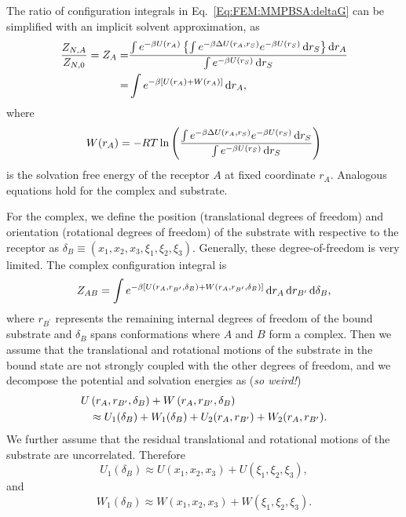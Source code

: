 The ratio of configuration integrals in Eq.~\ref{Eq:FEM:MMPBSA:deltaG} can be simplified with an implicit solvent approximation, as
\begin{align}
	\frac{Z_{N,A}}{Z_{N,0}}=Z_A=&\frac{\int e^{-\beta U(r_A)}\left\{\int e^{-\beta\Delta U(r_A,r_S)}e^{-\beta U(r_S)}\mathop{}\!\mathrm{d} r_S\right\}\mathop{}\!\mathrm{d} r_A}{\int e^{-\beta U(r_S)}\mathop{}\!\mathrm{d} r_S}\notag\\
	                           =&\int e^{-\beta \left[U(r_A)+W(r_A)\right]}\mathop{}\!\mathrm{d} r_A,
\end{align}
where
\begin{equation}
	W(r_A)=-RT\ln{\left(\frac{\int e^{-\beta\Delta U(r_A,r_S)}e^{-\beta U(r_S)}\mathop{}\!\mathrm{d}r_S}{\int e^{-\beta U(r_S)}\mathop{}\!\mathrm{d}r_S}\right)}
\end{equation}
is the solvation free energy of the receptor $A$ at fixed coordinate $r_A$. Analogous equations hold for the complex and substrate.

For the complex, we define the position (translational degrees of freedom) and orientation (rotational degrees of freedom) of the substrate with respective to the receptor as $\delta_B\equiv\left(x_1,x_2,x_3,\xi_1,\xi_2,\xi_3\right)$. Generally, these degree-of-freedom is very limited. The complex configuration integral is 
\begin{equation}
	Z_{AB}=\int e^{-\beta\left[U\left(r_A,r_{B^\prime},\delta_B\right)+W\left(r_A,r_{B^\prime},\delta_B\right)\right]}\mathop{}\!\mathrm{d} r_A\mathop{}\!\mathrm{d} r_{B^\prime}\mathop{}\!\mathrm{d}\delta_B,
\end{equation}
where $r_{B^\prime}$ represents the remaining internal degrees of freedom of the bound substrate and $\delta_B$ spans conformations where $A$ and $B$ form a complex. 
Then we assume that the translational and rotational motions of the substrate in the bound state are not strongly coupled with the other degrees of freedom, and we decompose the potential and solvation energies as (\textit{so weird!})
\begin{align}
	U&\left(r_A,r_{B^\prime},\delta_B\right)+W\left(r_A,r_{B^\prime},\delta_B\right)\notag\\
	 &\approx U_1(\delta_B) + W_1(\delta_B) +U_2(r_A,r_{B^\prime})+W_2(r_A,r_{B^\prime}).
\end{align}
We further assume that the residual translational and rotational motions of the substrate are uncorrelated. Therefore
\begin{equation}
	U_1(\delta_B) \approx U(x_1,x_2,x_3) + U(\xi_1,\xi_2,\xi_3),
\end{equation}
and
\begin{equation}
	W_1(\delta_B) \approx W(x_1,x_2,x_3) + W(\xi_1,\xi_2,\xi_3).
\end{equation}

